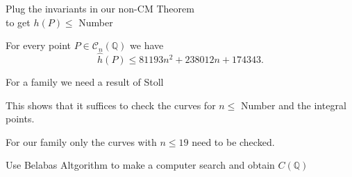 \documentclass[12pt]{beamer}
\newcommand{\qe}{\mathbb{Q}}
\newcommand{\Ci}{\mathcal{C}}
\begin{document}
\begin{frame}

\begin{alertblock}{Plug the invariants in our non-CM Theorem\\
 to get
$h(P)\le$ Number}\end{alertblock}

For every point $P\in \Ci_n(\qe)$ we have
$$\hat h(P)\leq 81193 n^2 + 238012 n + 174343.$$



\pause

 \begin{alertblock} {For a family we need  a result of Stoll} \end{alertblock}

 
 This  shows that it suffices to check the curves for $n\le$ Number  and the integral points.
  
 For our family only the curves with $n\leq 19$ need to be checked.

\pause

\begin{alertblock}{Use Belabas Altgorithm to make a computer search and obtain $C({\mathbb{Q}})$}  \end{alertblock}
\end{frame}
\end{document}

